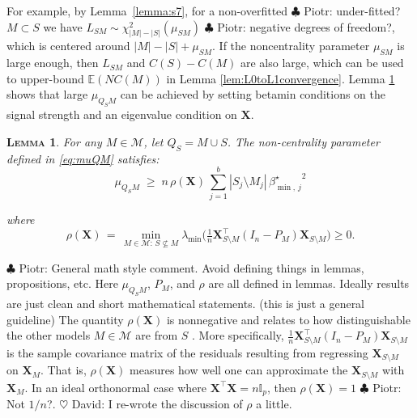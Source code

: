 \documentclass[aos]{imsart}
\theoremstyle{plain}
\newtheorem{lem}{\textsc{Lemma}}[section]
\newcommand{\david}[1]{{\small{\color{blue} \sf $\heartsuit$ David: #1}}}
\newcommand{\piotr}[1]{{\small{\color{red} \sf $\clubsuit$ Piotr: #1}}}
\newcommand{\I}{\mathbb{I}}
\newcommand{\bs}{\boldsymbol}
\begin{document}
For example, by Lemma~\ref{lemma:s7}, for a non-overfitted \piotr{under-fitted?} $M\subset S$ we have $L_{SM}\sim \chi^2_{|M|-|S|}(\mu_{SM})$\piotr{negative degrees of freedom?}, which is centered around $|M|-|S|+\mu_{SM}$.
If the noncentrality parameter $\mu_{SM}$ is large enough, then $L_{SM}$ and $C(S)-C(M)$ are also large, which can be used to upper-bound $\mathbb{E}(NC(M))$ in Lemma \ref{lem:L0toL1convergence}.
Lemma \ref{lem:boundrho} shows that large $\mu_{Q_SM}$
can be achieved by setting betamin conditions on the signal strength and an eigenvalue condition on $\bs X$.  

\begin{lem}\label{lem:boundrho}
 For any $M\in\mathcal{M}$, let $Q_S=M \cup S$. The non-centrality parameter defined in \eqref{eq:muQM} satisfies: 
    \begin{equation}\label{eq:musmbound}
    \mu_{Q_SM}\; \geq \;n\,\rho(\bs X)\,\sum_{j=1}^b|S_j\setminus M_j|\,{\beta_{\min,\,j}^{\star}}^2
\end{equation}

where \begin{equation}\label{eq:rhoX}
        \rho(\bs X)\,=\,\min_{M \in \mathcal{M}:\, S \not \subseteq M} \lambda_{\min}\big(\tfrac{1}{n} \boldsymbol{X}_{S \setminus M}^{\top}\left(I_n- P_M\right) \boldsymbol{X}_{S \setminus M}\big) \geq 0.
    \end{equation}
\end{lem}
\piotr{General math style comment. Avoid defining things in lemmas, propositions, etc. Here $\mu_{Q_SM}$, $P_M$, and $\rho$ are all defined in lemmas. Ideally results are just clean and short mathematical statements. (this is just a general guideline)}
The quantity $\rho(\bs X)$ is nonnegative and relates to 
how distinguishable the other models $M\in \mathcal{M}$ are from $S$ \citep{infotheowainwright}. 
More specifically, $\tfrac{1}{n} \boldsymbol{X}_{S \setminus M}^{\top}\left(I_n- P_M\right) \boldsymbol{X}_{S \setminus M}$ is the sample covariance matrix of the residuals resulting from regressing $\boldsymbol{X}_{S \setminus M}$ on $\boldsymbol{X}_M$.
That is, $\rho(\bs X)$ measures how well one can approximate the 
$\boldsymbol{X}_{S \setminus M}$ with $\boldsymbol{X}_M$.
In an ideal orthonormal case where $\bs X^{\top}\bs X=n\I_p$, then $\rho(\bs X)=1$\piotr{Not $1/n$?}. 
\david{I re-wrote the discussion of $\rho$ a little.}
\end{document}
